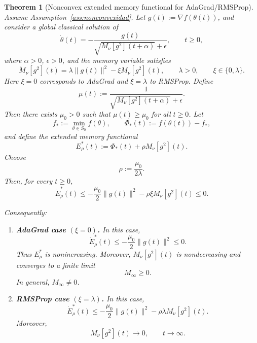 \documentclass{article} %
\newtheorem{theorem}{Theorem}
\begin{document}
\begin{theorem}[Nonconvex extended memory functional for AdaGrad/RMSProp]
\label{thm:nonconvex_extended_memory_adagrad_rmsprop}
Assume Assumption~\ref{ass:nonconvexidad}. Let $g(t):=\nabla f(\theta(t))$, and consider a global classical solution of
\begin{equation}
\label{eq:nonconvex_extended_memory_dyn}
    \dot\theta(t)
    =
    -
    \frac{g(t)}
    {\sqrt{M_\nu[g^2](t+\alpha)}+\epsilon},
    \qquad t\geq0,
\end{equation}
where \(\alpha>0\), \(\epsilon>0\), and the memory variable satisfies
\begin{equation}
\label{eq:nonconvex_extended_memory_ode}
    \dot M_\nu[g^2](t)
    =
    \lambda\|g(t)\|^2-\xi M_\nu[g^2](t),
    \qquad
    \lambda>0,
    \qquad
    \xi\in\{0,\lambda\}.
\end{equation}
Here \(\xi=0\) corresponds to AdaGrad and \(\xi=\lambda\) to RMSProp. Define
\[
    \mu(t)
    :=
    \frac{1}
    {\sqrt{M_\nu[g^2](t+\alpha)}+\epsilon}.
\]
Then there exists \(\mu_0>0\) such that $\mu(t)\geq\mu_0$ for all $t\geq0$. Let
\[
    f_*:=\min_{\theta\in S_0}f(\theta),
    \qquad
    \Phi_*(t):=f(\theta(t))-f_*,
\]
and define the extended memory functional
\[
    E_\rho^*(t)
    :=
    \Phi_*(t)+\rho M_\nu[g^2](t).
\]
Choose
\[
    \rho:=\frac{\mu_0}{2\lambda}.
\]
Then, for every \(t\geq0\),
\begin{equation}
\label{eq:nonconvex_Erho_dissipation}
    \dot E_\rho^*(t)
    \leq
    -
    \frac{\mu_0}{2}\|g(t)\|^2
    -
    \rho\xi M_\nu[g^2](t)
    \leq0.
\end{equation}

Consequently:

\begin{enumerate}
\item \textbf{AdaGrad case \((\xi=0)\).}
In this case,
\[
    \dot E_\rho^*(t)
    \leq
    -
    \frac{\mu_0}{2}\|g(t)\|^2
    \leq0.
\]
Thus \(E_\rho^*\) is nonincreasing. Moreover, $M_\nu[g^2](t)$ is nondecreasing and converges to a finite limit
\[
    M_\infty\geq0.
\]
In general, \(M_\infty\neq0\).

\item \textbf{RMSProp case \((\xi=\lambda)\).}
In this case,
\[
    \dot E_\rho^*(t)
    \leq
    -
    \frac{\mu_0}{2}\|g(t)\|^2
    -
    \rho\lambda M_\nu[g^2](t).
\]
Moreover,
\[
    M_\nu[g^2](t)\to0,
    \qquad t\to\infty.
\]


\end{enumerate}
\end{theorem}
\end{document}
